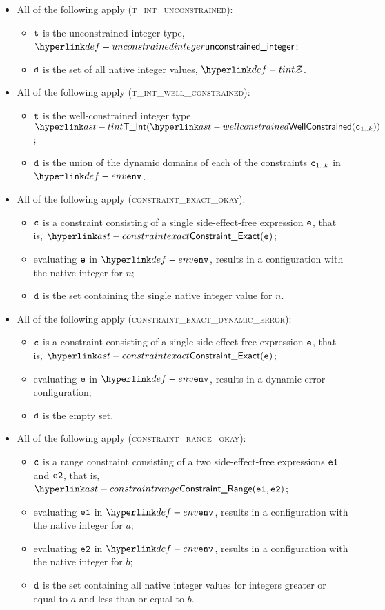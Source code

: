 \begin{itemize}
  \item All of the following apply (\textsc{t\_int\_unconstrained}):
  \begin{itemize}
    \item $\texttt{t}$ is the unconstrained integer type, $\unconstrainedinteger$;
    \item $\texttt{d}$ is the set of all native integer values, $\tint$.
  \end{itemize}

  \item All of the following apply (\textsc{t\_int\_well\_constrained}):
  \begin{itemize}
    \item $\texttt{t}$ is the well-constrained integer type $\TInt(\wellconstrained(\vc_{1..k}))$;
    \item $\texttt{d}$ is the union of the dynamic domains of each of the constraints $\texttt{c}_{1..k}$ in $\env$.
  \end{itemize}

  \item All of the following apply (\textsc{constraint\_exact\_okay}):
  \begin{itemize}
    \item $\texttt{c}$ is a constraint consisting of a single side-effect-free expression $\texttt{e}$, that is, $\ConstraintExact(\ve)$;
    \item evaluating $\texttt{e}$ in $\env$, results in a configuration with the native integer for $n$;
    \item $\texttt{d}$ is the set containing the single native integer value for $n$.
  \end{itemize}

  \item All of the following apply (\textsc{constraint\_exact\_dynamic\_error}):
  \begin{itemize}
    \item $\texttt{c}$ is a constraint consisting of a single side-effect-free expression $\texttt{e}$, that is, $\ConstraintExact(\ve)$;
    \item evaluating $\texttt{e}$ in $\env$, results in a dynamic error configuration;
    \item $\texttt{d}$ is the empty set.
  \end{itemize}

  \item All of the following apply (\textsc{constraint\_range\_okay}):
  \begin{itemize}
    \item $\texttt{c}$ is a range constraint consisting of a two side-effect-free expressions $\texttt{e1}$ and $\texttt{e2}$, that is, $\ConstraintRange(\veone, \vetwo)$;
    \item evaluating $\texttt{e1}$ in $\env$, results in a configuration with the native integer for $a$;
    \item evaluating $\texttt{e2}$ in $\env$, results in a configuration with the native integer for $b$;
    \item $\texttt{d}$ is the set containing all native integer values for integers greater or equal to $a$ and less than or equal to $b$.
  \end{itemize}


\end{itemize}
